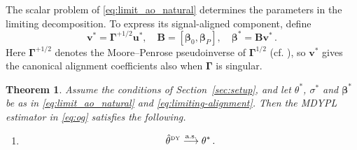 \documentclass{article}
\newtheorem{theorem}{Theorem}[section]
\theoremstyle{definition}
\newcommand*{\bb}{\boldsymbol}
\newcommand{\thetady}{\ensuremath{\hat{\theta}^{\textrm{\tiny DY}}}}
\def\bu{\bb{u}}
\def\bv{\bb{v}}
\def\bbeta{\bb{\beta}}
\begin{document}
\begin{bibunit}
The scalar problem of \eqref{eq:limit_ao_natural} determines the parameters in the limiting
decomposition. To express its signal-aligned component, define
\begin{equation}
\label{eq:limiting-alignment}
    \bv^*
    =
    \bb\Gamma^{+1/2}\bu^*,
    \quad 
    \bb B
    =
    [\bbeta_0,\bbeta_P],
    \quad
    \bbeta^*
    =
    \bb B\bv^*\,.
\end{equation}
Here $\bb\Gamma^{+1/2}$ denotes the Moore--Penrose pseudoinverse of
$\bb\Gamma^{1/2}$ (cf. \citealt[Chapter~2]{magnus+neudecker:2019}), so $\bv^*$ gives the canonical alignment coefficients
also when $\bb\Gamma$ is singular. 
\begin{theorem}
    \label{thm:mdypl-convergence}
    Assume the conditions of Section~\ref{sec:setup}, and let
    $\theta^*$, $\sigma^*$ and $\bbeta^*$ be as in
    \eqref{eq:limit_ao_natural} and \eqref{eq:limiting-alignment}. Then the
    MDYPL estimator in \eqref{eq:og} satisfies the following.

    \begin{enumerate}[label=(\roman*)]
        \item
        $$
            \thetady
            \overset{\mathrm{a.s.}}{\longrightarrow}
            \theta^*\,.
        $$


\end{enumerate}
\end{theorem}
\end{bibunit}
\end{document}
